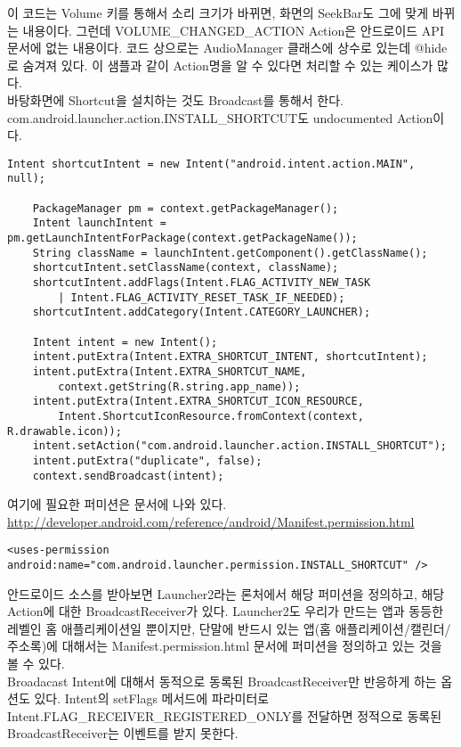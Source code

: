 이 코드는 Volume 키를 통해서 소리 크기가 바뀌면, 화면의 SeekBar도 그에 맞게 바뀌는 내용이다. 
그런데 VOLUME\_CHANGED\_ACTION Action은 안드로이드 API 문서에 없는 내용이다.
코드 상으로는 AudioManager 클래스에 상수로 있는데 @hide로 숨겨져 있다. 
이 샘플과 같이 Action명을 알 수 있다면 처리할 수 있는 케이스가 많다.\\

바탕화면에 Shortcut을 설치하는 것도 Broadcast를 통해서 한다. com.android.launcher.action.INSTALL\_SH\-ORT\-CUT도 undocumented Action이다.
\begin{lstlisting}[frame=single] 
	Intent shortcutIntent = new Intent("android.intent.action.MAIN", null);
		
	PackageManager pm = context.getPackageManager();
	Intent launchIntent = pm.getLaunchIntentForPackage(context.getPackageName());
	String className = launchIntent.getComponent().getClassName();
	shortcutIntent.setClassName(context, className);
	shortcutIntent.addFlags(Intent.FLAG_ACTIVITY_NEW_TASK 
		| Intent.FLAG_ACTIVITY_RESET_TASK_IF_NEEDED);
	shortcutIntent.addCategory(Intent.CATEGORY_LAUNCHER);

	Intent intent = new Intent();
	intent.putExtra(Intent.EXTRA_SHORTCUT_INTENT, shortcutIntent);
	intent.putExtra(Intent.EXTRA_SHORTCUT_NAME,
		context.getString(R.string.app_name));
	intent.putExtra(Intent.EXTRA_SHORTCUT_ICON_RESOURCE,
		Intent.ShortcutIconResource.fromContext(context, R.drawable.icon));
	intent.setAction("com.android.launcher.action.INSTALL_SHORTCUT");
	intent.putExtra("duplicate", false);
	context.sendBroadcast(intent);
\end{lstlisting}
여기에 필요한 퍼미션은 문서에 나와 있다.\\
\url{http://developer.android.com/reference/android/Manifest.permission.html}
\begin{verbatim}
<uses-permission android:name="com.android.launcher.permission.INSTALL_SHORTCUT" />
\end{verbatim}

안드로이드 소스를 받아보면 Launcher2라는 론처에서 해당 퍼미션을 정의하고, 해당 Action에 대한 BroadcastReceiver가 있다.
Launcher2도 우리가 만드는 앱과 동등한 레벨인 홈 애플리케이션일 뿐이지만, 단말에 반드시 있는 앱(홈 애플리케이션/캘린더/주소록)에 대해서는 Manifest.permission.html 문서에 퍼미션을 정의하고 있는 것을 볼 수 있다.\\

Broadacast Intent에 대해서 동적으로 동록된 BroadcastReceiver만 반응하게 하는 옵션도 있다. Intent의 setFlags 메서드에 파라미터로 Intent.FLAG\_RECEIVER\_REGISTERED\_ONLY를 전달하면 정적으로 동록된 BroadcastReceiver는 이벤트를 받지 못한다.

